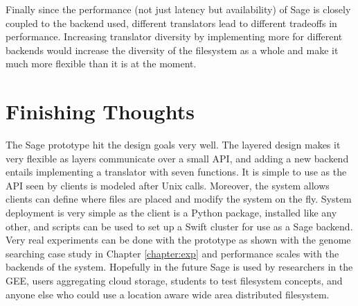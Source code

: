 Finally since the performance (not just latency but availability) of Sage is
closely coupled to the backend used, different translators lead to different
tradeoffs in performance. Increasing translator diversity by implementing more
for different backends would increase the diversity of the filesystem as a
whole and make it much more flexible than it is at the moment.



\section{Finishing Thoughts}


The Sage prototype hit the design goals very well. The layered design makes it
very flexible as layers communicate over a small API, and adding a new backend
entails implementing a translator with seven functions. It is simple to use as
the API seen by clients is modeled after Unix calls. Moreover, the system
allows clients can define where files are placed and modify the system on the
fly. System deployment is very simple as the client is a Python package,
installed like any other, and scripts can be used to set up a Swift cluster
for use as a Sage backend. Very real experiments can be done with the
prototype as shown with the genome searching case study in Chapter
\ref{chapter:exp} and performance scales with the backends of the system.
Hopefully in the future Sage is used by researchers in the GEE, users
aggregating cloud storage, students to test filesystem concepts, and anyone
else who could use a location aware wide area distributed filesystem.
